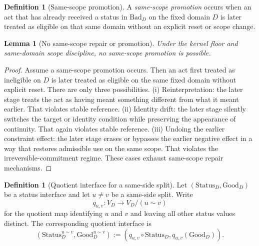 \documentclass[11pt]{article}
\theoremstyle{plain}
\newtheorem{lemma}[theorem]{Lemma}
\theoremstyle{definition}
\newtheorem{definition}[theorem]{Definition}
\newcommand{\domain}{D}
\newcommand{\Good}{\mathrm{Good}}
\newcommand{\Bad}{\mathrm{Bad}}
\begin{document}
\begin{definition}[Same-scope promotion]
A \emph{same-scope promotion} occurs when an act that has already received a status in $\Bad_\domain$ on the fixed domain $\domain$ is later treated as eligible on that same domain without an explicit reset or scope change.
\end{definition}

\begin{lemma}[No same-scope repair or promotion]
\label{lem:B-no-promotion}
Under the kernel floor and same-domain scope discipline, no same-scope promotion is possible.
\end{lemma}

\begin{proof}
Assume a same-scope promotion occurs. Then an act first treated as ineligible on $\domain$ is later treated as eligible on the same fixed domain without explicit reset. There are only three possibilities. (i) Reinterpretation: the later stage treats the act as having meant something different from what it meant earlier. That violates stable reference. (ii) Identity drift: the later stage silently switches the target or identity condition while preserving the appearance of continuity. That again violates stable reference. (iii) Undoing the earlier constraint effect: the later stage erases or bypasses the earlier negative effect in a way that restores admissible use on the same scope. That violates the irreversible-commitment regime. These cases exhaust same-scope repair mechanisms.
\end{proof}

\begin{definition}[Quotient interface for a same-side split]
Let $(\mathrm{Status}_\domain,\Good_\domain)$ be a status interface and let $u\neq v$ be a same-side split. Write
\[
q_{u,v}:V_\domain\to V_\domain/(u\sim v)
\]
for the quotient map identifying $u$ and $v$ and leaving all other status values distinct. The corresponding quotient interface is
\[
(\mathrm{Status}^{u\sim v}_\domain,\Good^{u\sim v}_\domain):=(q_{u,v}\circ \mathrm{Status}_\domain,q_{u,v}(\Good_\domain)).
\]
\end{definition}
\end{document}
